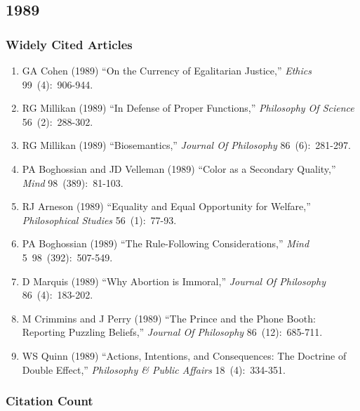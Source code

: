 \documentclass[
  10pt,
  letterpaper,
  DIV=11,
  numbers=noendperiod,
  twoside]{scrartcl}
\providecommand{\tightlist}{%
  \setlength{\itemsep}{0pt}\setlength{\parskip}{0pt}}\usepackage{longtable,booktabs,array}
\begin{document}
\newpage

\subsection{1989}\label{sec-s1989}

\subsubsection*{Widely Cited Articles}\label{widely-cited-articles-32}

\begin{enumerate}
\def\labelenumi{\arabic{enumi}.}
\tightlist
\item
  GA Cohen (1989) ``On the Currency of Egalitarian Justice,''
  \emph{Ethics} 99~(4):~906-944.
\item
  RG Millikan (1989) ``In Defense of Proper Functions,''
  \emph{Philosophy Of Science} 56~(2):~288-302.
\item
  RG Millikan (1989) ``Biosemantics,'' \emph{Journal Of Philosophy}
  86~(6):~281-297.
\item
  PA Boghossian and JD Velleman (1989) ``Color as a Secondary Quality,''
  \emph{Mind} 98~(389):~81-103.
\item
  RJ Arneson (1989) ``Equality and Equal Opportunity for Welfare,''
  \emph{Philosophical Studies} 56~(1):~77-93.
\item
  PA Boghossian (1989) ``The Rule-Following Considerations,''
  \emph{Mind} 5~98~(392):~507-549.
\item
  D Marquis (1989) ``Why Abortion is Immoral,'' \emph{Journal Of
  Philosophy} 86~(4):~183-202.
\item
  M Crimmins and J Perry (1989) ``The Prince and the Phone Booth:
  Reporting Puzzling Beliefs,'' \emph{Journal Of Philosophy}
  86~(12):~685-711.
\item
  WS Quinn (1989) ``Actions, Intentions, and Consequences: The Doctrine
  of Double Effect,'' \emph{Philosophy \& Public Affairs}
  18~(4):~334-351.
\end{enumerate}

\subsubsection*{Citation Count}\label{sec-count-1989}
\end{document}
